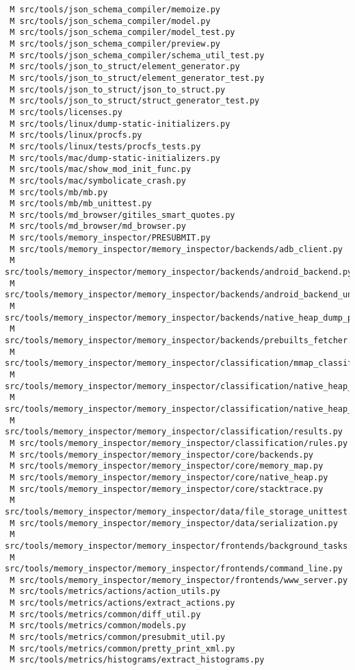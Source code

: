 \documentclass{article}
\begin{document}
\begin{verbatim}
 M src/tools/json_schema_compiler/memoize.py
 M src/tools/json_schema_compiler/model.py
 M src/tools/json_schema_compiler/model_test.py
 M src/tools/json_schema_compiler/preview.py
 M src/tools/json_schema_compiler/schema_util_test.py
 M src/tools/json_to_struct/element_generator.py
 M src/tools/json_to_struct/element_generator_test.py
 M src/tools/json_to_struct/json_to_struct.py
 M src/tools/json_to_struct/struct_generator_test.py
 M src/tools/licenses.py
 M src/tools/linux/dump-static-initializers.py
 M src/tools/linux/procfs.py
 M src/tools/linux/tests/procfs_tests.py
 M src/tools/mac/dump-static-initializers.py
 M src/tools/mac/show_mod_init_func.py
 M src/tools/mac/symbolicate_crash.py
 M src/tools/mb/mb.py
 M src/tools/mb/mb_unittest.py
 M src/tools/md_browser/gitiles_smart_quotes.py
 M src/tools/md_browser/md_browser.py
 M src/tools/memory_inspector/PRESUBMIT.py
 M src/tools/memory_inspector/memory_inspector/backends/adb_client.py
 M src/tools/memory_inspector/memory_inspector/backends/android_backend.py
 M src/tools/memory_inspector/memory_inspector/backends/android_backend_unittest.py
 M src/tools/memory_inspector/memory_inspector/backends/native_heap_dump_parser.py
 M src/tools/memory_inspector/memory_inspector/backends/prebuilts_fetcher.py
 M src/tools/memory_inspector/memory_inspector/classification/mmap_classifier.py
 M src/tools/memory_inspector/memory_inspector/classification/native_heap_classifier.py
 M src/tools/memory_inspector/memory_inspector/classification/native_heap_classifier_unittest.py
 M src/tools/memory_inspector/memory_inspector/classification/results.py
 M src/tools/memory_inspector/memory_inspector/classification/rules.py
 M src/tools/memory_inspector/memory_inspector/core/backends.py
 M src/tools/memory_inspector/memory_inspector/core/memory_map.py
 M src/tools/memory_inspector/memory_inspector/core/native_heap.py
 M src/tools/memory_inspector/memory_inspector/core/stacktrace.py
 M src/tools/memory_inspector/memory_inspector/data/file_storage_unittest.py
 M src/tools/memory_inspector/memory_inspector/data/serialization.py
 M src/tools/memory_inspector/memory_inspector/frontends/background_tasks.py
 M src/tools/memory_inspector/memory_inspector/frontends/command_line.py
 M src/tools/memory_inspector/memory_inspector/frontends/www_server.py
 M src/tools/metrics/actions/action_utils.py
 M src/tools/metrics/actions/extract_actions.py
 M src/tools/metrics/common/diff_util.py
 M src/tools/metrics/common/models.py
 M src/tools/metrics/common/presubmit_util.py
 M src/tools/metrics/common/pretty_print_xml.py
 M src/tools/metrics/histograms/extract_histograms.py

\end{verbatim}
\end{document}

